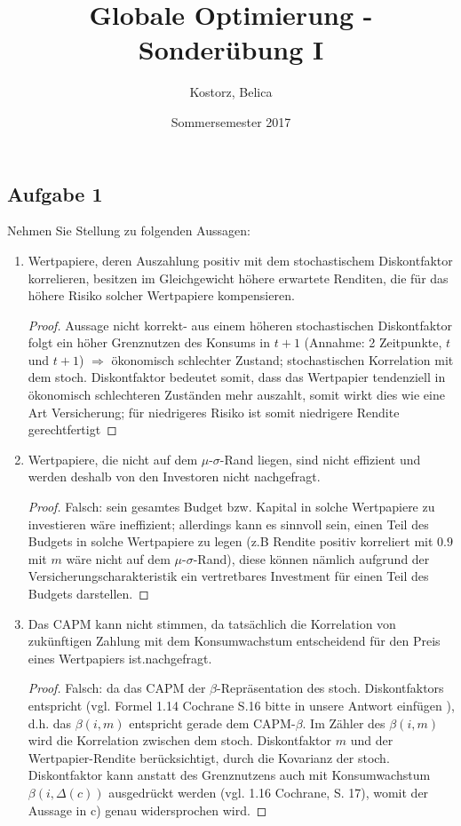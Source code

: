 \documentclass[12pt]{extreport} %
\title{Globale Optimierung - Sonderübung I}
\author{Kostorz, Belica}
\date{Sommersemester 2017}
\theoremstyle{named}
\theoremstyle{nnamed}
\theoremstyle{itshape}
\theoremstyle{normal}
\begin{document}
\thispagestyle{empty}
\thispagestyle{firststyle}
\subsection*{Aufgabe 1}

Nehmen Sie Stellung zu folgenden Aussagen:
\begin{enumerate}
	\item Wertpapiere, deren Auszahlung positiv mit dem stochastischem Diskontfaktor  korrelieren, besitzen im Gleichgewicht höhere erwartete Renditen, die für das höhere Risiko solcher Wertpapiere kompensieren.
		\begin{proof}
			Aussage nicht korrekt- aus einem höheren stochastischen Diskontfaktor folgt ein höher Grenznutzen des Konsums in $t+1$ (Annahme: 2 Zeitpunkte, $t$ und $t+1$) $\Rightarrow$ ökonomisch schlechter Zustand; stochastischen Korrelation mit dem stoch. Diskontfaktor bedeutet somit, dass das Wertpapier tendenziell in ökonomisch schlechteren Zuständen mehr auszahlt, somit wirkt dies wie eine Art Versicherung; für niedrigeres Risiko ist somit niedrigere Rendite gerechtfertigt
		\end{proof}
	\item Wertpapiere, die nicht auf dem $\mu$-$\sigma$-Rand liegen, sind nicht effizient und werden deshalb von den Investoren nicht nachgefragt.
		\begin{proof}
			Falsch: sein gesamtes Budget bzw. Kapital in solche Wertpapiere zu investieren wäre ineffizient; allerdings kann es sinnvoll sein, einen Teil des Budgets in solche Wertpapiere zu legen (z.B Rendite positiv korreliert mit $0.9$ mit $m$ wäre nicht auf dem $\mu$-$\sigma$-Rand), diese können nämlich aufgrund der Versicherungscharakteristik ein vertretbares Investment für einen Teil des Budgets darstellen.
		\end{proof}
	\item Das CAPM kann nicht stimmen, da tatsächlich die Korrelation von zukünftigen Zahlung mit dem Konsumwachstum entscheidend für den Preis eines Wertpapiers ist.nachgefragt.
		\begin{proof}
			Falsch: da das CAPM der $\beta$-Repräsentation des stoch. Diskontfaktors entspricht (vgl. Formel 1.14 Cochrane S.16 bitte in unsere Antwort einfügen ), d.h. das $\beta(i,m)$ entspricht gerade dem CAPM-$\beta$. Im Zähler des $\beta(i,m)$ wird die Korrelation zwischen dem stoch. Diskontfaktor $m$ und der Wertpapier-Rendite berücksichtigt, durch die Kovarianz der stoch. Diskontfaktor kann anstatt des Grenznutzens auch mit Konsumwachstum $\beta\left(i, \Delta(c) \right)$ ausgedrückt werden (vgl. 1.16 Cochrane, S. 17), womit der Aussage in c) genau widersprochen wird.

\end{proof}
\end{enumerate}
\end{document}
